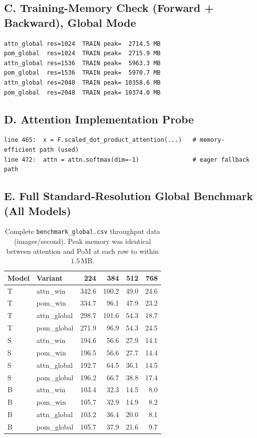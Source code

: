 \documentclass[11pt,a4paper]{article}
\begin{document}
\subsection*{C. Training-Memory Check (Forward + Backward), Global Mode}
\begin{lstlisting}[basicstyle=\ttfamily\scriptsize]
attn_global res=1024  TRAIN peak=  2714.5 MB
pom_global  res=1024  TRAIN peak=  2715.9 MB
attn_global res=1536  TRAIN peak=  5963.3 MB
pom_global  res=1536  TRAIN peak=  5970.7 MB
attn_global res=2048  TRAIN peak= 10358.6 MB
pom_global  res=2048  TRAIN peak= 10374.0 MB
\end{lstlisting}

\subsection*{D. Attention Implementation Probe}
\begin{lstlisting}[basicstyle=\ttfamily\scriptsize]
line 465:  x = F.scaled_dot_product_attention(...)   # memory-efficient path (used)
line 472:  attn = attn.softmax(dim=-1)               # eager fallback path
\end{lstlisting}

\subsection*{E. Full Standard-Resolution Global Benchmark (All Models)}
\begin{table}[H]
\centering
\small
\caption{Complete \texttt{benchmark\_global.csv} throughput data (images/second). Peak memory was identical between attention and PoM at each row to within $1.5$\,MB.}
\begin{tabular}{l l r r r r}
\toprule
\textbf{Model} & \textbf{Variant} & \textbf{224} & \textbf{384} & \textbf{512} & \textbf{768} \\
\midrule
T & attn\_win    & 342.6 & 100.2 & 49.0 & 24.6 \\
T & pom\_win     & 334.7 & 96.1  & 47.9 & 23.2 \\
T & attn\_global & 298.7 & 101.6 & 54.3 & 18.7 \\
T & pom\_global  & 271.9 & 96.9  & 54.3 & 24.5 \\
\midrule
S & attn\_win    & 194.6 & 56.6 & 27.9 & 14.1 \\
S & pom\_win     & 196.5 & 56.6 & 27.7 & 14.4 \\
S & attn\_global & 192.7 & 64.5 & 36.1 & 14.5 \\
S & pom\_global  & 196.2 & 66.7 & 38.8 & 17.4 \\
\midrule
B & attn\_win    & 103.4 & 32.3 & 14.5 & 8.0 \\
B & pom\_win     & 105.7 & 32.9 & 14.9 & 8.2 \\
B & attn\_global & 103.2 & 36.4 & 20.0 & 8.1 \\
B & pom\_global  & 105.7 & 37.9 & 21.6 & 9.7 \\
\bottomrule
\end{tabular}
\end{table}
\end{document}

